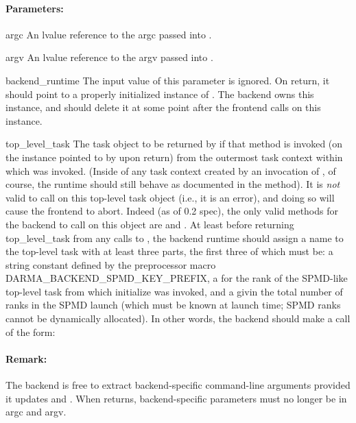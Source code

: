 \paragraph{Parameters:}
\begin{compactdesc} 
\item[argc] An lvalue reference to the argc passed into .
\item[argv] An lvalue reference to the argv passed into .
\item[backend\_runtime] The input value of this parameter is ignored.  On return, it should
   point to a properly initialized instance of .  The backend owns this
   instance, and should delete it at some point after the frontend calls  on
   this instance.
\item[top\_level\_task] The task object to be returned by  if that
   method is invoked (on the instance pointed to by  upon return) from the outermost
   task context within which  was invoked.  (Inside of any task context
   created by an invocation of , of course, the runtime should still behave as documented
   in the  method).  It is \emph{not} valid to call  on this
   top-level task object (i.e., it is an error), and doing so will cause the frontend to abort.
   Indeed (as of 0.2 spec), the only valid methods for the backend to call on this object are
    and .  At least before returning top\_level\_task from any calls to
   , the backend runtime should assign a name to the top-level task
   with at least three parts, the first three of which must be: a string constant defined by the
   preprocessor macro DARMA\_BACKEND\_SPMD\_KEY\_PREFIX, a  for the rank of the SPMD-like
   top-level task from which initialize was invoked, and a  givin the total number of
   ranks in the SPMD launch (which must be known at launch time; SPMD ranks cannot be dynamically
   allocated).  In other words, the backend should make a call of the form:
\end{compactdesc}

\paragraph{Remark:} The backend is free to extract backend-specific command-line arguments provided it
   updates  and .  When  returns, backend-specific parameters
   must no longer be in argc and argv.


